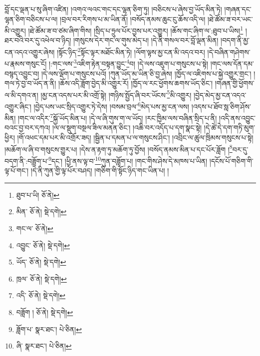 བློ་དང་ལྡན་པ་སུ་ཞིག་འཛིན། །འགའ་ལའང་གང་དང་ལྷན་ཅིག་ཏུ། །བཅིངས་པ་ཞེས་བྱ་ཡོད་མིན་ཏེ། །གཞན་དང་ལྷན་ཅིག་བཅིངས་པ་ལ། །བྲལ་བར་རིགས་པ་མ་ཡིན་ནོ། །བསོད་ནམས་ཆུང་ངུ་ཆོས་འདི་ལ། །ཐེ་ཚོམ་ཟ་བར་ཡང་མི་འགྱུར། །ཐེ་ཚོམ་ཟ་བ་ཙམ་ཞིག་གིས། །སྲིད་པ་ཧྲུལ་པོར་བྱས་པར་འགྱུར། །ཆོས་གང་ཞིག་ལ་:ཐུབ་པ་ཡིས།\footnote{ཐུབ་པ་ཡི།  ཅོ་ནེ། } །ཐར་བའི་བར་དུ་འཕེལ་བ་ཉིད། །གསུངས་དེར་གང་ལ་གུས་མེད་པ། །དེ་ནི་གསལ་བར་བློ་ལྡན་མིན། །བདག་ནི་མྱ་ངན་འདའ་འགྱུར་ཞེས། །སྟོང་ཉིད་\footnote{མིན་  ཅོ་ནེ།  སྡེ་དགེ། }སྟོང་ལྟར་མཐོང་མིན་ཏེ། །ལོག་ལྟས་མྱ་ངན་མི་འདའ་བར། །དེ་བཞིན་གཤེགས་པ་རྣམས་གསུང་ངོ། །:གང་ལས་\footnote{གང་ལ་  ཅོ་ནེ། }འཇིག་རྟེན་བསྟན་བྱུང་\footnote{འབྱུང་  ཅོ་ནེ།  སྡེ་དགེ། }བ། །དེ་ལས་འཇུག་པ་གསུངས་པ་སྟེ། །གང་ལས་དོན་དམ་བསྙད་འབྱུང་བ། །དེ་ལས་ལྡོག་པ་གསུངས་པའོ། །ཀུན་ཡོད་མ་ཡིན་ཅི་བྱ་ཞེས། །ཁྱོད་ལ་འཇིགས་པ་སྐྱེ་འགྱུར་གྲང་། །གལ་ཏེ་བྱ་བ་ཡོད་ན་ནི། །ཆོས་འདི་ཟློག་བྱེད་མི་འགྱུར་རོ། །ཁྱོད་ལ་རང་ཕྱོགས་ཆགས་ཡོད་ཅིང་། །གཞན་གྱི་ཕྱོགས་ལ་མི་དགའ་ན། །མྱ་ངན་འདས་པར་མི་འགྲོ་སྟེ། །གཉིས་སྤྱོད་ཞི་བར་ཡོངས་\footnote{ཡོད་  ཅོ་ནེ།  སྡེ་དགེ། }མི་འགྱུར། །བྱེད་མེད་མྱ་ངན་འདའ་འགྱུར་ཞིང་། །བྱེད་པས་ཡང་སྲིད་འགྱུར་ཏེ་དེས། །བསམ་བྲལ་\footnote{ཁྲལ་  ཅོ་ནེ།  སྡེ་དགེ། }མེད་པས་མྱ་ངན་ལས། །འདས་པ་ཐོབ་སླ་ཅིག་ཤོས་མིན། །གང་ལ་འདིར་\footnote{འདི་  ཅོ་ནེ།  སྡེ་དགེ། }སྐྱོ་ཡོད་མིན་པ། །དེ་ལ་ཞི་གུས་ག་ལ་ཡོད། །རང་ཁྱིམ་ལས་བཞིན་སྲིད་པ་ནི། །འདི་ནས་འབྱུང་བའང་བྱ་བར་དཀའ། །ལ་ལ་སྡུག་བསྔལ་ཟིལ་མནན་ཅིང་། །འཆི་བར་འདོད་པ་དག་སྣང་སྟེ། །དེ་ཚེ་དེ་དག་གཏི་མུག་ཕྱིར། །གོ་འཕང་དམ་པར་མི་འགྲོར་ཟད། །སྦྱིན་པ་དམན་པ་ལ་གསུངས་ཤིང་། །འབྲིང་ལ་ཚུལ་ཁྲིམས་གསུངས་པ་སྟེ། །མཆོག་ལ་ཞི་བ་གསུངས་གྱུར་པ། །དེས་ན་རྟག་ཏུ་མཆོག་ཏུ་བྱོས། །བསོད་ནམས་མིན་པ་དང་པོར་ཟློག །\footnote{བཟློག །  ཅོ་ནེ།  སྡེ་དགེ། }བར་དུ་བདག་ནི་:བཟློག་པ་\footnote{ཟློག་པ་  སྣར་ཐང་།  པེ་ཅིན། }དང་། །ཕྱི་ནས་ལྟ་བ་\footnote{ཞི་  སྣར་ཐང་།  པེ་ཅིན། }ཀུན་བཟློག་པ། །གང་གིས་ཤེས་དེ་མཁས་པ་ཡིན། །དངོས་པོ་གཅིག་གི་ལྟ་པོ་གང་། །དེ་ནི་ཀུན་གྱི་ལྟ་པོར་བཤད། །གཅིག་གི་སྟོང་ཉིད་གང་ཡིན་པ། །
